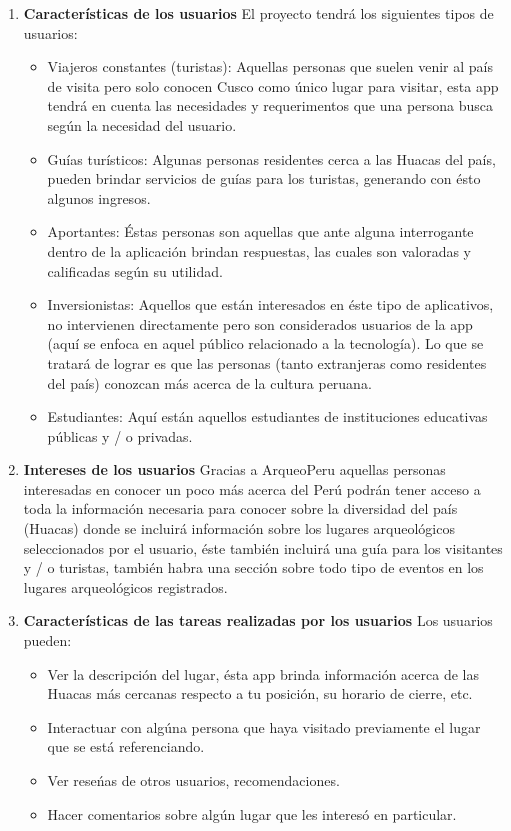 \documentclass[12pt,a4paper]{report}
\begin{document}
\begin{enumerate}[2.1.]
\item \textbf{\hspace{0.3cm} Caracter\'isticas de los usuarios}
\hfill \break
\hfill \break
El proyecto tendr\'a los siguientes tipos de usuarios:
\hfill \break
\begin{itemize}
\item Viajeros constantes (turistas): Aquellas personas que suelen venir al pa\'is de visita pero solo conocen Cusco como \'unico lugar para visitar, esta app tendr\'a en cuenta las necesidades y requerimentos que una persona busca seg\'un la necesidad del usuario.
\item Gu\'ias tur\'isticos: Algunas personas residentes cerca a las Huacas del pa\'is, pueden brindar servicios de gu\'ias para los turistas, generando con \'esto algunos ingresos.
\item Aportantes: \'Estas personas son aquellas que ante alguna interrogante dentro de la aplicaci\'on brindan respuestas, las cuales son valoradas y calificadas seg\'un su utilidad.
\item Inversionistas: Aquellos que est\'an interesados en \'este tipo de aplicativos, no intervienen directamente pero son considerados usuarios de la app (aqu\'i se enfoca en aquel p\'ublico relacionado a la tecnolog\'ia).\newline
Lo que se tratar\'a de lograr es que las personas (tanto extranjeras como residentes del pa\'is) conozcan m\'as acerca de la cultura peruana.
\item Estudiantes: Aqu\'i est\'an aquellos estudiantes de instituciones educativas p\'ublicas y / o privadas.
\end{itemize}
\hfill \break
\newpage
\item \textbf{\hspace{0.3cm} Intereses de los usuarios}
\hfill \break
Gracias a ArqueoPeru aquellas personas interesadas en conocer un poco m\'as acerca del Per\'u podr\'an tener acceso a toda la informaci\'on necesaria para conocer sobre la diversidad del pa\'is (Huacas) donde se incluir\'a informaci\'on sobre los lugares arqueol\'ogicos seleccionados por el usuario, \'este tambi\'en incluir\'a una gu\'ia para los visitantes y / o turistas, tambi\'en habra una secci\'on sobre todo tipo de eventos en los lugares arqueol\'ogicos registrados.
\hfill \break
\item \textbf{\hspace{0.3cm} Caracter\'isticas de las tareas realizadas por los usuarios}
\hfill \break
Los usuarios pueden:
\begin{itemize}
\item Ver la descripci\'on del lugar, \'esta app brinda informaci\'on acerca de las Huacas m\'as cercanas respecto a tu posici\'on, su horario de cierre, etc.
\item Interactuar con alg\'una persona que haya visitado previamente el lugar que se est\'a referenciando.
\item Ver rese\'nas de otros usuarios, recomendaciones.
\item Hacer comentarios sobre alg\'un lugar que les interes\'o en particular.
\end{itemize}


\end{enumerate}
\end{document}
